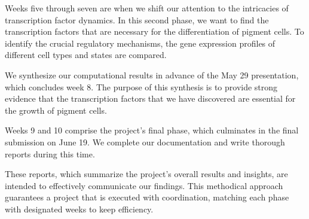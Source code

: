 \documentclass[runningheads]{llncs}
\begin{document}
Weeks five through seven are when we shift our attention to the intricacies of transcription factor dynamics. In this second phase, we want to find the transcription factors that are necessary for the differentiation of pigment cells. To identify the crucial regulatory mechanisms, the gene expression profiles of different cell types and states are compared.

We synthesize our computational results in advance of the May 29 presentation, which concludes week 8. The purpose of this synthesis is to provide strong evidence that the transcription factors that we have discovered are essential for the growth of pigment cells.

Weeks 9 and 10 comprise the project's final phase, which culminates in the final submission on June 19. We complete our documentation and write thorough reports during this time. 

These reports, which summarize the project's overall results and insights, are intended to effectively communicate our findings. This methodical approach guarantees a project that is executed with coordination, matching each phase with designated weeks to keep efficiency.

\paragraph{}
\paragraph{}




\end{document}
